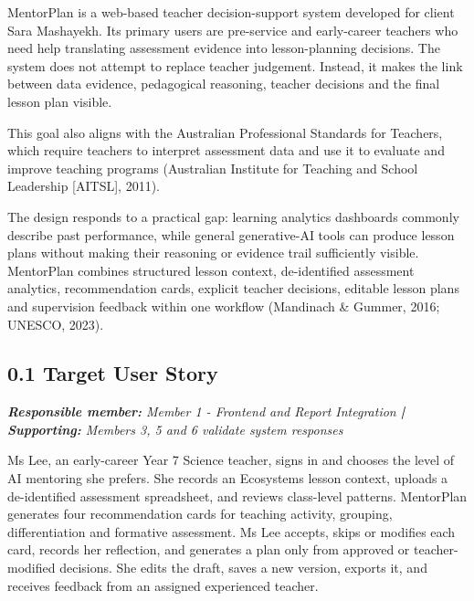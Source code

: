 \documentclass[11pt,a4paper]{article}
\begin{document}
MentorPlan is a web-based teacher decision-support system developed for client Sara Mashayekh. Its primary users are pre-service and early-career teachers who need help translating assessment evidence into lesson-planning decisions. The system does not attempt to replace teacher judgement. Instead, it makes the link between data evidence, pedagogical reasoning, teacher decisions and the final lesson plan visible.\par

This goal also aligns with the Australian Professional Standards for Teachers, which require teachers to interpret assessment data and use it to evaluate and improve teaching programs (Australian Institute for Teaching and School Leadership [AITSL], 2011).\par

The design responds to a practical gap: learning analytics dashboards commonly describe past performance, while general generative-AI tools can produce lesson plans without making their reasoning or evidence trail sufficiently visible. MentorPlan combines structured lesson context, de-identified assessment analytics, recommendation cards, explicit teacher decisions, editable lesson plans and supervision feedback within one workflow (Mandinach \& Gummer, 2016; UNESCO, 2023).\par

\subsection*{0.1 Target User Story}


\noindent\textit{\textbf{Responsible member: }Member 1 - Frontend and Report Integration\textbf{ | Supporting: }Members 3, 5 and 6 validate system responses}\par

Ms Lee, an early-career Year 7 Science teacher, signs in and chooses the level of AI mentoring she prefers. She records an Ecosystems lesson context, uploads a de-identified assessment spreadsheet, and reviews class-level patterns. MentorPlan generates four recommendation cards for teaching activity, grouping, differentiation and formative assessment. Ms Lee accepts, skips or modifies each card, records her reflection, and generates a plan only from approved or teacher-modified decisions. She edits the draft, saves a new version, exports it, and receives feedback from an assigned experienced teacher.\par
\end{document}
